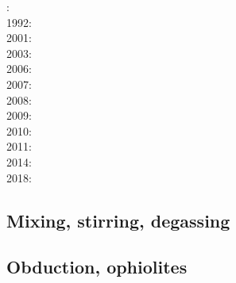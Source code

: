 {\scriptsize
{}: \cite{tosl78}\\
1992: \cite{dast92}\\
2001: \cite{bigu01}\cite{haki01}\\
2003: \cite{vank03}\\
2006: \cite{gogc06}\cite{gecy06}\\
2007: \cite{gogc07}\cite{knvk07}\cite{lohd07}\\
2008: \cite{knva08}\cite{cage08}\\
2009: \cite{leki09}\cite{heaa09}\\
2010: \cite{roms10}\cite{hogz10}\\
2011: \cite{zhgh11}\\
2014: \cite{ledg14}\cite{mabv14}\\
2018: \cite{pltv18}
}

\subsection{Mixing, stirring, degassing} 

{\scriptsize
\noindent
\cite{olyb84}
\cite{ketu90}
\cite{pelt96}
\cite{cori99}
\cite{huke01}
\cite{vahb02}
\cite{fasa03}\cite{vabh03}
\cite{colt05}
\cite{gogc07}\cite{nake07}\cite{vabh07}
\cite{lemj11}\cite{saad11}
\cite{onzh18}
}

\subsection{Obduction, ophiolites}
 

{\scriptsize
\noindent
\cite{hack90}
\cite{hack91}
\cite{mokd00}
\cite{agzf14}
\cite{duay16}
\cite{rohb20}
}

